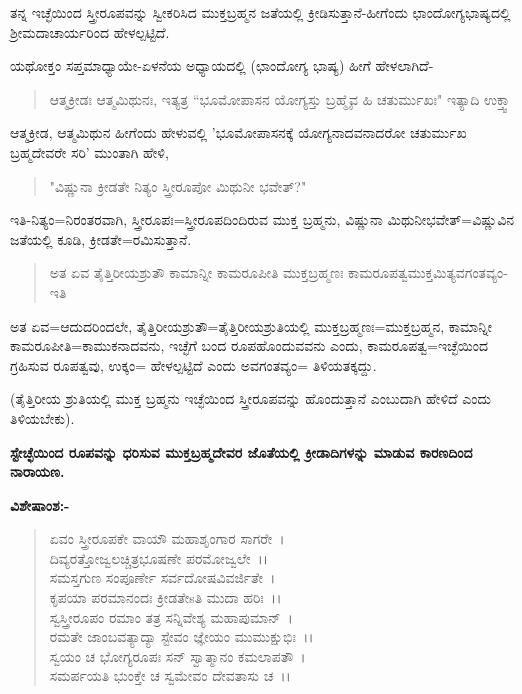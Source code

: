 ತನ್ನ ಇಚ್ಛೆಯಿಂದ ಸ್ತ್ರೀರೂಪವನ್ನು ಸ್ವೀಕರಿಸಿದ ಮುಕ್ತಬ್ರಹ್ಮನ ಜತೆಯಲ್ಲಿ ಕ್ರೀಡಿಸುತ್ತಾನೆ-ಹೀಗೆಂದು ಛಾಂದೋಗ್ಯಭಾಷ್ಯದಲ್ಲಿ ಶ‍್ರೀಮದಾಚಾರ್ಯರಿಂದ ಹೇಳಲ್ಪಟ್ಟಿದೆ.

ಯಥೋಕ್ತಂ ಸಪ್ತಮಾಧ್ಯಾಯೇ-ಏಳನೆಯ ಅಧ್ಯಾಯದಲ್ಲಿ (ಛಾಂದೋಗ್ಯ ಭಾಷ್ಯ) ಹೀಗೆ ಹೇಳಲಾಗಿದೆ-

\begin{verse}
ಆತ್ಮಕ್ರೀಡಃ ಆತ್ಮಮಿಥುನಃ, ಇತ್ಯತ್ರ “ಭೂಮೋಪಾಸನ ಯೋಗ್ಯಸ್ತು ಬ್ರಹ್ಮೈವ ಹಿ ಚತುರ್ಮುಖಃ" ಇತ್ಯಾದಿ ಉಕ್ತ್ವಾ
\end{verse}

ಆತ್ಮಕ್ರೀಡ, ಆತ್ಮಮಿಥುನ ಹೀಗೆಂದು ಹೇಳುವಲ್ಲಿ 'ಭೂಮೋಪಾಸನಕ್ಕೆ ಯೋಗ್ಯನಾದವನಾದರೋ ಚತುರ್ಮುಖ ಬ್ರಹ್ಮದೇವರೇ ಸರಿ' ಮುಂತಾಗಿ ಹೇಳಿ,

\begin{verse}
"ವಿಷ್ಣುನಾ ಕ್ರೀಡತೇ ನಿತ್ಯಂ ಸ್ತ್ರೀರೂಪೋ ಮಿಥುನೀ ಭವೇತ್?"
\end{verse}

ಇತಿ-ನಿತ್ಯಂ=ನಿರಂತರವಾಗಿ, ಸ್ತ್ರೀರೂಪಃ=ಸ್ತ್ರೀರೂಪದಿಂದಿರುವ ಮುಕ್ತ ಬ್ರಹ್ಮನು, ವಿಷ್ಣುನಾ ಮಿಥುನೀಭವೇತ್=ವಿಷ್ಣುವಿನ ಜತೆಯಲ್ಲಿ ಕೂಡಿ, ಕ್ರೀಡತೇ=ರಮಿಸುತ್ತಾನೆ.

\begin{verse}
ಅತ ಏವ ತೈತ್ತಿರೀಯಶ್ರುತೌ ಕಾಮಾನ್ನೀ ಕಾಮರೂಪೀತಿ ಮುಕ್ತಬ್ರಹ್ಮಣಃ ಕಾಮರೂಪತ್ವಮುಕ್ತಮಿತ್ಯವಗಂತವ್ಯಂ-ಇತಿ
\end{verse}

ಅತ ಏವ=ಆದುದರಿಂದಲೇ, ತೈತ್ತಿರೀಯಶ್ರುತೌ=ತೈತ್ತಿರೀಯಶ್ರುತಿಯಲ್ಲಿ ಮುಕ್ತಬ್ರಹ್ಮಣಃ=ಮುಕ್ತಬ್ರಹ್ಮನ, ಕಾಮಾನ್ನೀ ಕಾಮರೂಪೀತಿ=ಕಾಮುಕನಾದವನು, ಇಚ್ಛೆಗೆ ಬಂದ ರೂಪಹೊಂದುವವನು ಎಂದು, ಕಾಮರೂಪತ್ವ=ಇಚ್ಛೆಯಿಂದ ಗ್ರಹಿಸುವ ರೂಪತ್ವವು, ಉಕ್ಕಂ= ಹೇಳಲ್ಪಟ್ಟಿದೆ ಎಂದು ಅವಗಂತವ್ಯಂ= ತಿಳಿಯತಕ್ಕದ್ದು.

(ತೈತ್ತಿರೀಯ ಶ್ರುತಿಯಲ್ಲಿ ಮುಕ್ತ ಬ್ರಹ್ಮನು ಇಚ್ಛೆಯಿಂದ ಸ್ತ್ರೀರೂಪವನ್ನು ಹೊಂದುತ್ತಾನೆ ಎಂಬುದಾಗಿ ಹೇಳಿದೆ ಎಂದು ತಿಳಿಯಬೇಕು).

\begin{center}
\textbf{ಸ್ಟೇಚ್ಛೆಯಿಂದ ರೂಪವನ್ನು ಧರಿಸುವ ಮುಕ್ತಬ್ರಹ್ಮದೇವರ ಜೊತೆಯಲ್ಲಿ ಕ್ರೀಡಾದಿಗಳನ್ನು ಮಾಡುವ ಕಾರಣದಿಂದ ನಾರಾಯಣ.}
\end{center}

\noindent
\textbf{ವಿಶೇಷಾಂಶ:-}

\begin{verse}
ಏವಂ ಸ್ತ್ರೀರೂಪಕೇ ವಾಯೌ ಮಹಾಶೃಂಗಾರ ಸಾಗರೇ~।\\ ದಿವ್ಯರತ್ತೋಜ್ವಲಚ್ಚಿತ್ರಭೂಷಣೇ ಪರಮೋಜ್ವಲೇ~।।\\ ಸಮಸ್ತಗುಣ ಸಂಪೂರ್ಣೇ ಸರ್ವದೋಷವಿವರ್ಜಿತೇ~।\\ ಕೃಪಯಾ ಪರಮಾನಂದಃ ಕ್ರೀಡತೇsತಿ ಮುದಾ ಹರಿಃ~।।\\ ಸ್ವಸ್ತ್ರೀರೂಪಂ ರಮಾಂ ತತ್ರ ಸನ್ನಿವೇಶ್ಯ ಮಹಾಪುಮಾನ್~।\\ ರಮತೇ ಜಾಂಬವತ್ಯಾದ್ಯಾ ಸ್ಟೇವಂ ಜ್ಞೇಯಂ ಮುಮುಕ್ಷುಭಿಃ~।।\\ ಸ್ವಯಂ ಚ ಭೋಗ್ಯರೂಪಃ ಸನ್ ಸ್ವಾತ್ಮಾನಂ ಕಮಲಾಪತೌ~।\\ ಸಮರ್ಪಯತಿ ಭುಂಕ್ತೇ ಚ ಸ್ವಮೇವಂ ದೇವತಾಸು ಚ~।।
\end{verse}

